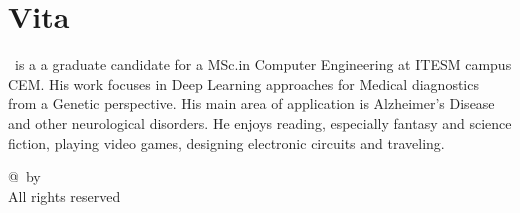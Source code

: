 \chapter*{Vita} \label{Vita}


\begin{center}
\end{center}

\authorName\ is a a graduate candidate for a MSc.in Computer Engineering at ITESM campus CEM. His work focuses in Deep Learning approaches for Medical diagnostics from a Genetic perspective. His main area of application is Alzheimer's Disease and other neurological disorders. He enjoys reading, especially fantasy and science fiction, playing video games, designing electronic circuits and traveling.

\begin{center}
\end{center}

\begin{center}
	{@}\thesisYear\ by \authorName \\
	All rights reserved
\end{center}

\null
\vfill

\begin{center}
	\packageDetails
\end{center}

\begin{center}
    \textbf{\thesisDate} 
\end{center}


